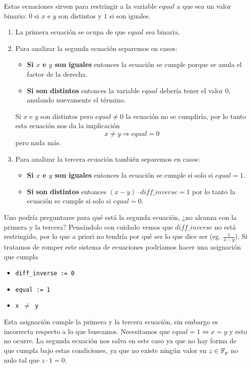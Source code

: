 Estas ecuaciones sirven para restringir a la variable $equal$ a que sea un valor binario: $0$ si $x$ e $y$ son distintos y $1$ si son iguales. 
\begin{enumerate}
	\item La primera ecuación se ocupa de que $equal$ sea binaria. 
	
	\item Para analizar la segunda ecuación separemos en casos:
	\begin{itemize}
		\item \textbf{Si $x$ e $y$ son iguales} entonces la ecuación se cumple porque se anula el factor de la derecha.
		\item \textbf{Si son distintos} entonces la variable $equal$ debería tener el valor $0$, anulando nuevamente el término.
	\end{itemize}
	Si $x$ e $y$ son distintos pero $equal \neq 0$ la ecuación no se cumpliría, por lo tanto esta ecuación nos da la implicación 
	$$x \neq y \Longrightarrow equal = 0$$
	pero nada más.
	
	\item Para analizar la tercera ecuación también separemos en casos:
	\begin{itemize}
		\item \textbf{Si $x$ e $y$ son iguales} entonces la ecuación se cumple si solo si $equal = 1$.
		\item \textbf{Si son distintos} entonces $(x-y)\cdot diff\_inverse = 1$ por lo tanto la ecuación se cumple si solo si $equal = 0$.
	\end{itemize}
\end{enumerate}
Uno podría preguntarse para qué está la segunda ecuación, ¿no alcanza con la primera y la tercera? Pensándolo con cuidado vemos que $diff\_inverse$ no está restringido, por lo que a priori no tendría por qué ser lo que dice ser (eg. $\frac{1}{x-y}$). Si tratamos de romper este sistema de ecuaciones podríamos hacer una asignación que cumpla

\begin{itemize}
	\item \texttt{diff\_inverse := 0}
	\item \texttt{equal := 1}
	\item \texttt{x $\neq$ y}
\end{itemize}
Esta asignación cumple la primera y la tercera ecuación, sin embargo es incorrecta respecto a lo que buscamos. Necesitamos que $equal = 1 \Longleftrightarrow x = y$ y esto no ocurre. La segunda ecuación nos salva en este caso ya que no hay forma de que cumpla bajo estas condiciones, ya que no existe ningún valor en $z \in \mathbb{F}_p$ no nulo tal que $z \cdot 1 = 0$.

